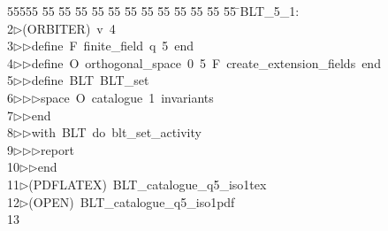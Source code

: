 %
%
\begin{tabbing}
55555 \= 55 \= 55 \= 55 \= 55 \= 55 \= 55 \= 55 \= 55 \= 55 \= 55 \= 55 \= 55 \= \>BLT\_5\_1:\\[0pt]
2\>$\triangleright$\>(ORBITER)\ v\ 4\ \\[0pt]
3\>$\triangleright$\>$\triangleright$\>define\ F\ finite\_field\ q\ 5\ end\ \\[0pt]
4\>$\triangleright$\>$\triangleright$\>define\ O\ orthogonal\_space\ 0\ 5\ F\ create\_extension\_fields\ end\ \\[0pt]
5\>$\triangleright$\>$\triangleright$\>define\ BLT\ BLT\_set\ \\[0pt]
6\>$\triangleright$\>$\triangleright$\>$\triangleright$\>space\ O\ catalogue\ 1\ invariants\ \\[0pt]
7\>$\triangleright$\>$\triangleright$\>end\ \\[0pt]
8\>$\triangleright$\>$\triangleright$\>with\ BLT\ do\ blt\_set\_activity\ \\[0pt]
9\>$\triangleright$\>$\triangleright$\>$\triangleright$\>report\ \\[0pt]
10\>$\triangleright$\>$\triangleright$\>end\\[0pt]
11\>$\triangleright$\>(PDFLATEX)\ BLT\_catalogue\_q5\_iso1tex\\[0pt]
12\>$\triangleright$\>(OPEN)\ BLT\_catalogue\_q5\_iso1pdf\\[0pt]
13\>\end{tabbing}
